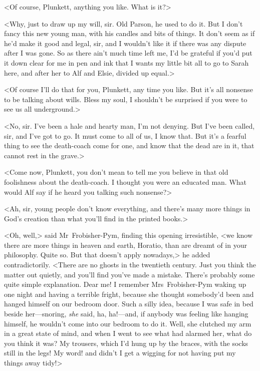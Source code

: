 <Of course, Plunkett, anything you like. What is it?>

<Why, just to draw up my will, sir. Old Parson, he used to do it. But I don't fancy this new young man, with his candles and bits of things. It don't seem as if he'd make it good and legal, sir, and I wouldn't like it if there was any dispute after I was gone. So as there ain't much time left me, I'd be grateful if you'd put it down clear for me in pen and ink that I wants my little bit all to go to Sarah here, and after her to Alf and Elsie, divided up equal.>

<Of course I'll do that for you, Plunkett, any time you like. But it's all nonsense to be talking about wills. Bless my soul, I shouldn't be surprised if you were to see us all underground.>

<No, sir. I've been a hale and hearty man, I'm not denying. But I've been called, sir, and I've got to go. It must come to all of us, I know that. But it's a fearful thing to see the death-coach come for one, and know that the dead are in it, that cannot rest in the grave.>

<Come now, Plunkett, you don't mean to tell me you believe in that old foolishness about the death-coach. I thought you were an educated man. What would Alf say if he heard you talking such nonsense?>

<Ah, sir, young people don't know everything, and there's many more things in God's creation than what you'll find in the printed books.>

<Oh, well,> said Mr~Frobisher-Pym, finding this opening irresistible, <we know there are more things in heaven and earth, Horatio, than are dreamt of in your philosophy. Quite so. But that doesn't apply nowadays,> he added contradictorily. <There are no ghosts in the twentieth century. Just you think the matter out quietly, and you'll find you've made a mistake. There's probably some quite simple explanation. Dear me! I remember Mrs~Frobisher-Pym waking up one night and having a terrible fright, because she thought somebody'd been and hanged himself on our bedroom door. Such a silly idea, because I was safe in bed beside her—snoring, \emph{she} said, ha, ha!—and, if anybody was feeling like hanging himself, he wouldn't come into our bedroom to do it. Well, she clutched my arm in a great state of mind, and when I went to see what had alarmed her, what do you think it was? My trousers, which I'd hung up by the braces, with the socks still in the legs! My word! and didn't I get a wigging for not having put my things away tidy!>

